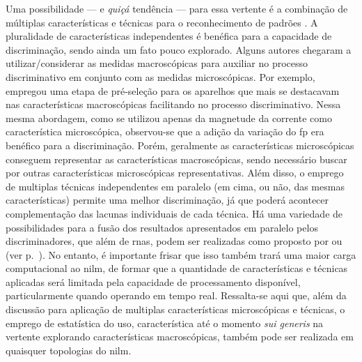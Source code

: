 Uma possibilidade --- e \emph{quiçá} tendência --- para essa vertente é a
combinação de múltiplas características e técnicas para o
reconhecimento de padrões \cite{
nilm_zeifman_vast_hisample_pdfmerge_2011,nilm_liang_pt1_2010_34,
nilm_liang_pt2_2010_40}. A pluralidade de características
independentes é benéfica para a capacidade de discriminação, sendo
ainda um fato pouco explorado. Alguns autores chegaram a
utilizar/considerar as medidas macroscópicas para auxiliar no processo
discriminativo em conjunto com as medidas microscópicas. Por exemplo, 
\cite{nilm_coppe_nascimento} empregou uma etapa de pré-seleção para os
aparelhos que mais se destacavam nas características macroscópicas
facilitando no processo discriminativo. Nessa mesma abordagem, como se
utilizou apenas da magnetude da corrente como característica
microscópica, observou-se que a adição da variação do \gls{fp} era
benéfico para a discriminação. Porém, geralmente as características
microscópicas conseguem representar as características macroscópicas,
sendo necessário buscar por outras características microscópicas
representativas. Além disso, o emprego de multiplas técnicas
independentes em paralelo (em cima, ou não, das mesmas características)
permite uma melhor discriminação, já que poderá acontecer
complementação das lacunas individuais de cada técnica. Há uma
variedade de possibilidades para a fusão dos resultados apresentados em
paralelo pelos discriminadores, que além de \glspl{rna}, podem ser
realizadas como proposto por \cite{nilm_liang_pt1_2010_34} ou
\cite{nilm_zeifman_review_2011} (ver
p.~\pageref{text:uniao_tecnicas}). No entanto, é importante frisar que
isso também trará uma maior carga computacional ao \gls{nilm}, de
formar que a quantidade de características e técnicas aplicadas será
limitada pela capacidade de processamento disponível, particularmente
quando operando em tempo real. Ressalta-se aqui que, além da discussão
para aplicação de multiplas características microscópicas e técnicas,
o emprego de estatística do uso, característica até o momento
\emph{sui generis} na vertente explorando características
macroscópicas, também pode ser realizada em quaisquer topologias do
\gls{nilm}.

